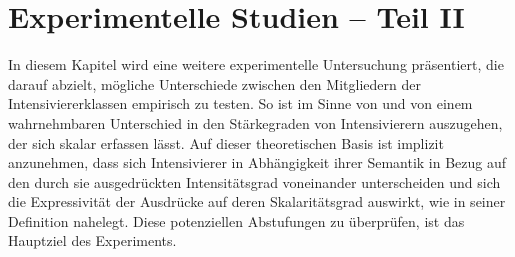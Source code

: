 




\chapter{{Experimentelle Studien -- Teil II}} \label{Experimente}
In diesem Kapitel wird eine weitere experimentelle Untersuchung präsentiert, die darauf abzielt, mögliche Unterschiede zwischen den Mitgliedern der Intensiviererklassen empirisch zu testen. So ist im Sinne von {\citet[87]{Biedermann.1969}} und \citet[408]{Breindl.2007} von einem wahrnehmbaren Unterschied in den Stärkegraden von Intensivierern auszugehen, der sich skalar erfassen lässt. Auf dieser theoretischen Basis ist implizit anzunehmen, dass sich Intensivierer in Abhängigkeit ihrer Semantik in Bezug auf den durch sie ausgedrückten Intensitätsgrad voneinander unterscheiden und sich die Expressivität der Ausdrücke auf deren Skalaritätsgrad auswirkt, wie \citet[133]{Gutzmann.2019a} in seiner Definition nahelegt. Diese potenziellen Abstufungen zu überprüfen, ist das Hauptziel des Experiments.


